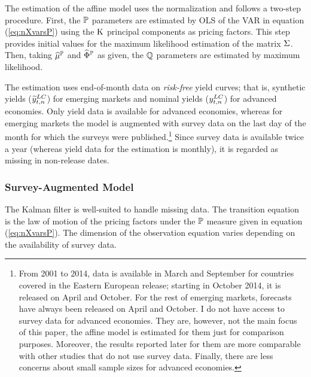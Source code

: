 {The estimation of the affine model uses the \cite{JSZ:2011} normalization and follows a two-step procedure. 
First, the \(\mathbb{P}\) parameters are estimated by OLS of the VAR in equation (\ref{eq:nXvarsP}) using the \(\mathrm{K}\) principal components as pricing factors. 
This step provides initial values for the maximum likelihood estimation of the matrix \(\Sigma\). Then, taking \(\widehat{\mu}^{\mathbb{P}}\) and \(\widehat{\Phi}^{\mathbb{P}}\) as given, the \(\mathbb{Q}\) parameters are estimated by maximum likelihood. 

The %
estimation uses end-of-month data on \textit{risk-free} yield curves; that is, synthetic yields (\(\widetilde{y}_{t,n} ^{LC}\)) for emerging markets and nominal yields (\(y_{t,n} ^{LC}\)) for advanced economies. 
Only yield data is available for advanced economies, whereas for emerging markets the model is augmented with survey data on the last day of the month for which the surveys were published.\footnote{ From 2001 to 2014, data is available in March and September for countries covered in the Eastern European release; starting in October 2014, it is released on April and October. For the rest of emerging markets, forecasts have always been released on April and October. %
	I do not have access to survey data for advanced economies. They are, however, not the main focus of this paper, the affine model is estimated for them just for comparison purposes. Moreover, the results reported later for them are more comparable with other studies that do not use survey data. Finally, there are less concerns about small sample sizes for advanced economies.} %
Since survey data is available twice a year (whereas yield data for the estimation is monthly), it is regarded as missing in non-release dates.

\subsubsection{Survey-Augmented Model} \label{sec:sATSM}
The Kalman filter is well-suited to handle missing data. 
The transition equation is the law of motion of the pricing factors under the \(\mathbb{P}\) measure given in equation (\ref{eq:nXvarsP}).
The dimension of the observation equation varies depending on the availability of survey data. 

}
